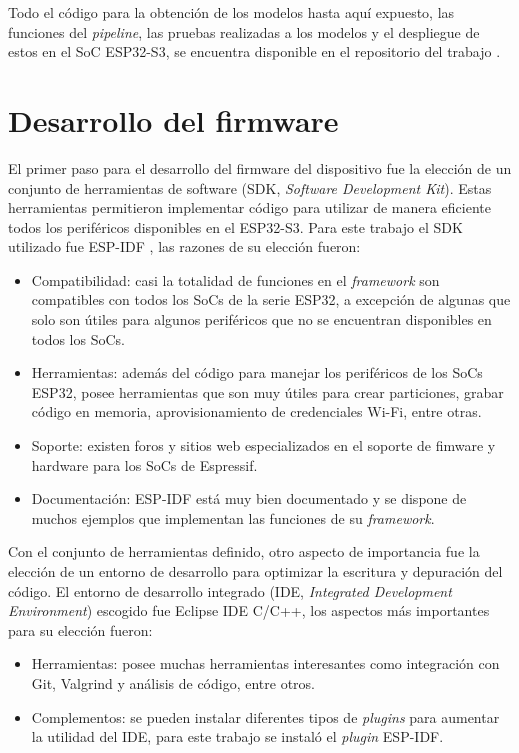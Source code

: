 Todo el código para la obtención de los modelos hasta aquí expuesto, las funciones del \textit{pipeline}, las pruebas realizadas a los modelos y el despliegue de estos en el SoC ESP32-S3, se encuentra disponible en el repositorio del trabajo \cite{mtcnn_repo}.

\section{Desarrollo del firmware}
El primer paso para el desarrollo del firmware del dispositivo fue la elección de un conjunto de herramientas de software (SDK, \textit{Software Development Kit}). Estas herramientas permitieron implementar código para utilizar de manera eficiente todos los periféricos disponibles en el ESP32-S3. Para este trabajo el SDK utilizado fue ESP-IDF \cite{idf_repo}, las razones de su elección fueron:
\begin{itemize}
	\item Compatibilidad: casi la totalidad de funciones en el \textit{framework} son compatibles con todos los SoCs de la serie ESP32, a excepción de algunas que solo son útiles para algunos periféricos que no se encuentran disponibles en todos los SoCs.
	\item Herramientas: además del código para manejar los periféricos de los SoCs ESP32, posee herramientas que son muy útiles para crear particiones, grabar código en memoria, aprovisionamiento de credenciales Wi-Fi, entre otras.
	\item Soporte: existen foros y sitios web especializados en el soporte de fimware y hardware para los SoCs de Espressif.
	\item Documentación: ESP-IDF está muy bien documentado y se dispone de muchos ejemplos que implementan las funciones de su \textit{framework}.
\end{itemize}

Con el conjunto de herramientas definido, otro aspecto de importancia fue la elección de un entorno de desarrollo para optimizar la escritura y depuración del código. El entorno de desarrollo integrado (IDE, \textit{Integrated Development Environment}) escogido fue Eclipse IDE C/C++, los aspectos más importantes para su elección fueron:
\begin{itemize}
	\item Herramientas: posee muchas herramientas interesantes como integración con Git, Valgrind y análisis de código, entre otros.
	\item Complementos: se pueden instalar diferentes tipos de \textit{plugins} para aumentar la utilidad del IDE, para este trabajo se instaló el \textit{plugin} ESP-IDF.
\end{itemize}

